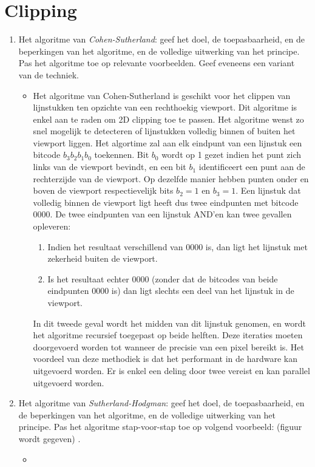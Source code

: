 \documentclass{report}
\newcommand{\vraag}[2]{
	\item #1
	
	#2
}
\begin{document}
	\section{Clipping}
	\begin{enumerate}
		\vraag{Het algoritme van \textit{Cohen-Sutherland}: geef het doel, de toepasbaarheid, en de beperkingen van het algoritme, en de volledige uitwerking van het principe. Pas het algoritme toe op relevante voorbeelden. Geef eveneens een variant van de techniek. \accentuate{(§2.3.1)}}{
			\begin{itemize} 
				\item Het algoritme van Cohen-Sutherland is geschikt voor het clippen van lijnstukken ten opzichte van een rechthoekig viewport. Dit algoritme is enkel aan te raden om 2D clipping toe te passen. Het algoritme wenst zo snel mogelijk te detecteren of lijnstukken volledig binnen of buiten het viewport liggen. Het algortime zal aan elk eindpunt van een lijnstuk een bitcode $ b_3b_2b_1b_0$ toekennen. Bit $b_0$ wordt op 1 gezet indien het punt zich links van de viewport bevindt, en een bit $b_1$ identificeert een punt aan de rechterzijde van de viewport. Op dezelfde manier hebben punten onder en boven de viewport respectievelijk bits $b_2 = 1$ en $b_3 = 1$. Een lijnstuk dat volledig binnen de viewport ligt heeft dus twee eindpunten met bitcode $0000$. De twee eindpunten van een lijnstuk AND'en kan twee gevallen opleveren:
				\begin{enumerate}
					\item Indien het resultaat verschillend van $0000$ is, dan ligt het lijnstuk met zekerheid buiten de viewport.
					\item Is het resultaat echter $0000$ (zonder dat de bitcodes van beide eindpunten $0000$ is) dan ligt slechts een deel van het lijnstuk in de viewport.
				\end{enumerate}
				In dit tweede geval wordt het midden van dit lijnstuk genomen, en wordt het algoritme recursief toegepast op beide helften. Deze iteraties moeten doorgevoerd worden tot wanneer de precisie van een pixel bereikt is. Het voordeel van deze methodiek is dat het performant in de hardware kan uitgevoerd worden. Er is enkel een deling door twee vereist en kan parallel uitgevoerd worden.
			 \end{itemize}
		}
		
		\vraag{Het algoritme van \textit{Sutherland-Hodgman}: geef het doel, de toepasbaarheid, en de beperkingen van het algoritme, en de volledige uitwerking van het principe. Pas het algoritme stap-voor-stap toe op volgend voorbeeld: (figuur wordt gegeven) . \accentuate{(§2.3.3)}}{\begin{itemize} \item \todo{oplossen} \end{itemize}}
	\end{enumerate}
\end{document}
